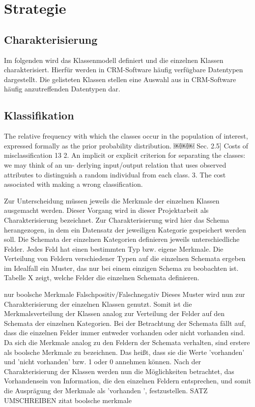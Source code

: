 \chapter{Strategie}
\label{chap:strategie}
\section{Charakterisierung}
Im folgenden wird das Klassenmodell definiert und die einzelnen Klassen charakterisiert. Hierfür werden in CRM-Software häufig verfügbare Datentypen dargestellt. Die gelisteten Klassen stellen eine Auswahl aus in CRM-Software häufig anzutreffenden Datentypen dar.

\section{Klassifikation}
 The relative frequency with which the classes occur in the population of interest, expressed formally as the prior probability distribution.
￼￼￼
Sec. 2.5] Costs of misclassification 13
2. An implicit or explicit criterion for separating the classes: we may think of an un- derlying input/output relation that uses observed attributes to distinguish a random individual from each class.
3. The cost associated with making a wrong classification.

Zur Unterscheidung müssen jeweils die Merkmale der einzelnen Klassen ausgemacht werden. Dieser Vorgang wird in dieser Projektarbeit als Charakterisierung bezeichnet. Zur Charakterisierung wird hier das Schema herangezogen, in dem ein Datensatz der jeweiligen Kategorie gespeichert werden soll. Die Schemata der einzelnen Kategorien definieren jeweils unterschiedliche Felder. 
Jedes Feld hat einen bestimmten Typ bzw. eigene Merkmale.
Die Verteilung von Feldern verschiedener Typen auf die einzelnen Schemata ergeben im Idealfall ein Muster, das nur bei einem einzigen Schema zu beobachten ist.
Tabelle X zeigt, welche Felder die einzelnen Schemata definieren.

nur boolsche Merkmale
Falschpositiv/Falschnegativ
Dieses Muster wird nun zur Charakterisierung der einzelnen Klassen genutzt. Somit ist die Merkmalsverteilung der Klassen analog zur Verteilung der Felder auf den Schemata der einzelnen Kategorien. 
Bei der Betrachtung der Schemata fällt auf, dass die einzelnen Felder immer entweder vorhanden oder nicht vorhanden sind. Da sich die Merkmale analog zu den Feldern der Schemata verhalten, sind erstere als boolsche Merkmale zu bezeichnen. Das heißt, dass sie die Werte 'vorhanden' und 'nicht vorhanden' bzw. 1 oder 0 annehmen können. Nach der Charakterisierung der Klassen werden nun die Möglichkeiten betrachtet, das Vorhandensein von Information, die den einzelnen Feldern entsprechen, und somit die Ausprägung der Merkmale als 'vorhanden ', festzustellen. 
SATZ UMSCHREIBEN
zitat boolsche merkmale

